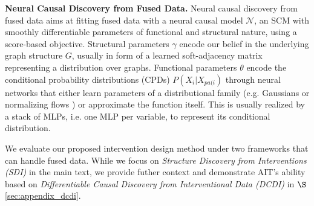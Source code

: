 \documentclass[nohyperref]{article}
\theoremstyle{plain}
\theoremstyle{definition}
\theoremstyle{remark}
\begin{document}
\textbf{Neural Causal Discovery from Fused Data.}
\label{sec:SDI}
Neural causal discovery from fused data aims at fitting fused data with a neural causal model $\mathcal{N}$, an SCM with smoothly differentiable parameters of functional and structural nature, using a score-based objective. Structural parameters $\gamma$ encode our belief in the underlying graph structure $G$, usually in form of a learned soft-adjacency matrix representing a distribution over graphs. Functional parameters $\theta$ encode the conditional probability distributions (CPDs) $P(X_i|X_{pa(i})$ through neural networks that either learn parameters of a distributional family (e.g. Gaussians or normalizing flows \cite{rezende2015variational}) or approximate the function itself. This is usually realized by a stack of MLPs, i.e. one MLP per variable, to represent its conditional distribution.

We evaluate our proposed intervention design method under two frameworks that can handle fused data. While we focus on \emph{Structure Discovery from Interventions (SDI)} \citep{ke2019learning} in the main text, %
we provide futher context and demonstrate AIT's ability based on \emph{Differentiable Causal Discovery from Interventional Data (DCDI)} \citep{brouillard2020differentiable} in $\S$\ref{sec:appendix_dcdi}.
\end{document}

